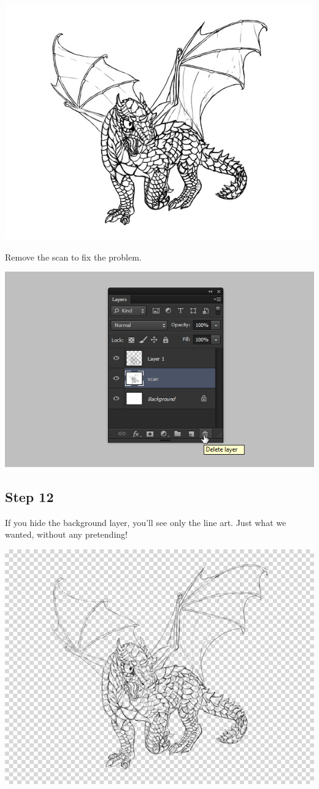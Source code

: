 \begin{center}
\includegraphics[width=0.7\linewidth]{Photos/quick-lineart-deselect}
\end{center}

Remove the scan to fix the problem.

\begin{center}
\includegraphics[width=0.7\linewidth]{Photos/quick-lineart-remove}
\end{center}

\subsection{Step 12}
If you hide the background layer, you'll see only the line art. Just what we wanted, without any pretending!

\begin{center}
\includegraphics[width=0.7\linewidth]{Photos/quick-lineart-transparent}
\end{center}

